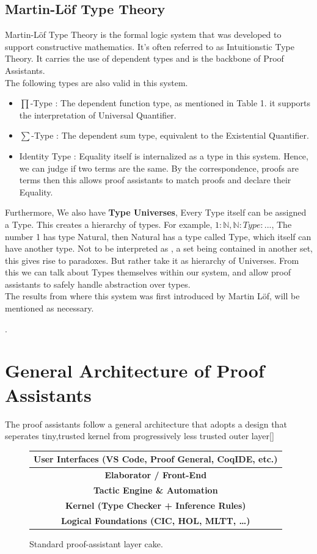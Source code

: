\documentclass[12pt]{article}
\begin{document}
 \subsection{Martin-Löf Type Theory }
    Martin-Löf Type Theory is the formal logic system that was developed to support constructive mathematics. It's often referred to as Intuitionstic Type Theory. It carries the use of dependent types and is the backbone of Proof Assistants.\\
        The following types are also valid in this system.
        \begin{itemize}
            \item $\prod$-Type : The dependent function type, as mentioned in Table 1. it supports the interpretation of Universal Quantifier.
            \item $\sum$-Type : The dependent sum type, equivalent to the Existential Quantifier.
            \item Identity Type : Equality itself is internalized as a type in this system. Hence, we can judge if two terms are the same. By the correspondence, proofs are terms then this allows proof assistants to match proofs and declare their Equality.
            
        \end{itemize}
        Furthermore, We also have \textbf{Type Universes}, Every Type itself can be assigned a Type. This creates a hierarchy of types. For example, $1:\mathbb{N},\mathbb{N}:Type:...$, The number 1 has type Natural, then Natural has a type called Type, which itself can have another type. Not to be interpreted as , a set being contained in another set, this gives rise to paradoxes. But rather take it as hierarchy of Universes. From this we can talk about Types themselves within our system, and  allow proof assistants to safely handle abstraction over types.\\
        The results from  \cite{martinlof1972intuitionistic_theory} where this system was first introduced by Martin Löf, will be mentioned as necessary.
        
        .

\section{General Architecture of Proof Assistants}
The proof assistants follow a general architecture that adopts a design that seperates tiny,trusted kernel from progressively less trusted outer layer[]
\begin{figure}[h]
\centering
\begin{tabular}{|c|}
\hline
\textbf{User Interfaces} (VS Code, Proof General, CoqIDE, etc.) \\\hline
\textbf{Elaborator / Front-End}\\
\hline
\textbf{Tactic Engine \& Automation}\\
\hline
\textbf{Kernel (Type Checker + Inference Rules)}\\
\hline
\textbf{Logical Foundations (CIC, HOL, MLTT, …)}\\
\hline
\end{tabular}
\caption{Standard proof-assistant layer cake.}
\label{fig:layers}
\end{figure}
\end{document}
